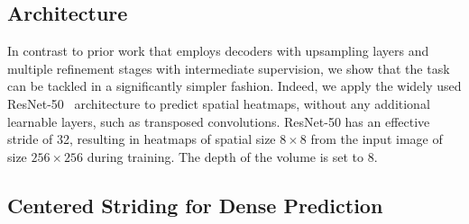 \subsection{Architecture}
In contrast to prior work that employs decoders with upsampling layers and multiple refinement stages with intermediate supervision, we show that the task can be tackled in a significantly simpler fashion.
Indeed, we apply the widely used ResNet-50~\cite{He16ECCV} architecture to predict spatial heatmaps, without any additional learnable layers, such as transposed convolutions.
ResNet-50 has an effective stride of 32, resulting in heatmaps of spatial size $8 \times 8$ from the input image of size $256\times 256$ during training.
The depth of the volume is set to 8.

\subsection{Centered Striding for Dense Prediction}

